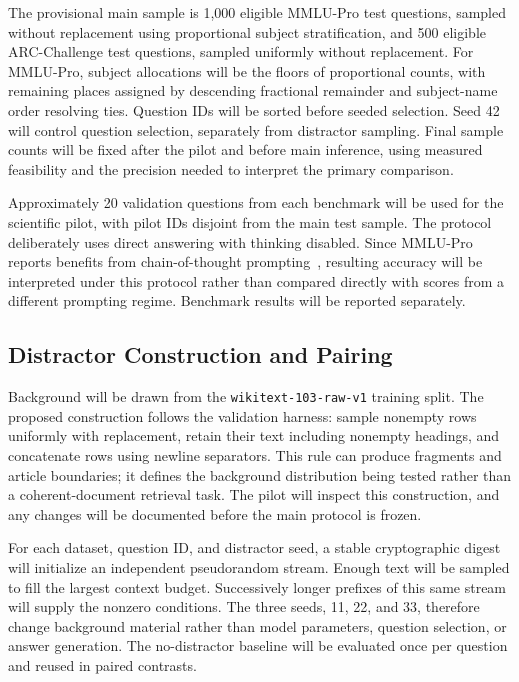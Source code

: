 \documentclass[conference]{IEEEtran}
\begin{document}
The provisional main sample is 1,000 eligible MMLU-Pro test questions, sampled without replacement using proportional subject stratification, and 500 eligible ARC-Challenge test questions, sampled uniformly without replacement. For MMLU-Pro, subject allocations will be the floors of proportional counts, with remaining places assigned by descending fractional remainder and subject-name order resolving ties. Question IDs will be sorted before seeded selection. Seed 42 will control question selection, separately from distractor sampling. Final sample counts will be fixed after the pilot and before main inference, using measured feasibility and the precision needed to interpret the primary comparison.

Approximately 20 validation questions from each benchmark will be used for the scientific pilot, with pilot IDs disjoint from the main test sample. The protocol deliberately uses direct answering with thinking disabled. Since MMLU-Pro reports benefits from chain-of-thought prompting~\cite{wang2024}, resulting accuracy will be interpreted under this protocol rather than compared directly with scores from a different prompting regime. Benchmark results will be reported separately.

\subsection{Distractor Construction and Pairing}
Background will be drawn from the \texttt{wikitext-103-raw-v1} training split. The proposed construction follows the validation harness: sample nonempty rows uniformly with replacement, retain their text including nonempty headings, and concatenate rows using newline separators. This rule can produce fragments and article boundaries; it defines the background distribution being tested rather than a coherent-document retrieval task. The pilot will inspect this construction, and any changes will be documented before the main protocol is frozen.

For each dataset, question ID, and distractor seed, a stable cryptographic digest will initialize an independent pseudorandom stream. Enough text will be sampled to fill the largest context budget. Successively longer prefixes of this same stream will supply the nonzero conditions. The three seeds, 11, 22, and 33, therefore change background material rather than model parameters, question selection, or answer generation. The no-distractor baseline will be evaluated once per question and reused in paired contrasts.
\end{document}
